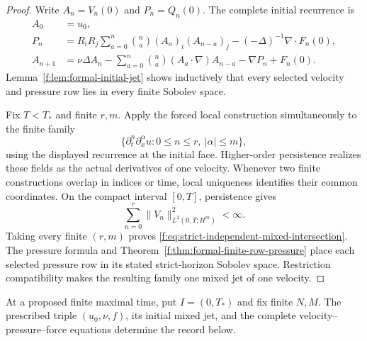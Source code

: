 \begin{proof}
Write \(A_n=V_n(0)\) and \(P_n=Q_n(0)\). The complete initial recurrence is
\[
 \begin{aligned}
 A_0&=u_0,\\
 P_n&=R_iR_j\sum_{a=0}^n\binom na(A_a)_i(A_{n-a})_j
      -(-\Delta)^{-1}\nabla\cdot F_n(0),\\
 A_{n+1}&=\nu\Delta A_n
 -\sum_{a=0}^n\binom na(A_a\cdot\nabla)A_{n-a}
 -\nabla P_n+F_n(0).
 \end{aligned}
\]
Lemma~\ref{f:lem:formal-initial-jet} shows inductively that every selected
velocity and pressure row lies in every finite Sobolev space.

Fix \(T<T_*\) and finite \(r,m\). Apply the forced local construction
simultaneously to the finite family
\[
 \bigl\{\partial_t^n\partial_x^\alpha u:
 0\le n\le r,\ |\alpha|\le m\bigr\},
\]
using the displayed recurrence at the initial face. Higher-order persistence
realizes these fields as the actual derivatives of one velocity. Whenever
two finite constructions overlap in indices or time, local uniqueness
identifies their common coordinates. On the compact interval \([0,T]\),
persistence gives
\[
 \sum_{n=0}^r\|V_n\|_{L^2(0,T;H^m)}^2<\infty.
\]
Taking every finite \((r,m)\) proves
\eqref{f:eq:strict-independent-mixed-intersection}. The pressure formula and
Theorem~\ref{f:thm:formal-finite-row-pressure} place each selected pressure row
in its stated strict-horizon Sobolev space. Restriction compatibility makes
the resulting family one mixed jet of one velocity.
\end{proof}

At a proposed finite maximal time, put \(I=(0,T_*)\) and fix finite
\(N,M\). The prescribed triple \((u_0,\nu,f)\), its initial mixed jet, and
the complete velocity--pressure--force equations determine the record below.

